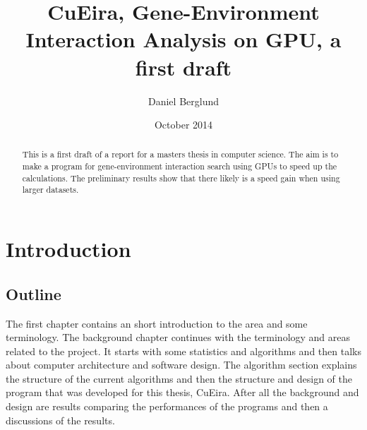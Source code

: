 \documentclass[10pt,a4paper]{report}
\title{CuEira, Gene-Environment Interaction Analysis on GPU, a first draft}
\author{Daniel Berglund}
\date{October 2014}
\makeatletter
\newcommand\ackname{Acknowledgements}
\newenvironment{acknowledgements}{
      \titlepage
      \null\vfil
      \@beginparpenalty\@lowpenalty
      \begin{center}%
        \bfseries \ackname
        \@endparpenalty\@M
      \end{center}}%
     {\par\vfil\null\endtitlepage}
\newenvironment{acknowledgements}{
      \if@twocolumn
        \section*{\abstractname}
      \else
        \small
        \begin{center}
          {\bfseries \ackname\vspace{-.5em}\vspace{\z@}}
        \end{center}
        \quotation
      \fi}
      {\if@twocolumn\else\endquotation\fi}
\makeatother
\begin{document}
\maketitle
\thispagestyle{empty}

\clearpage
\thispagestyle{empty}
\begin{abstract}
This is a first draft of a report for a masters thesis in computer science. The aim is to make a program for gene-environment interaction search using GPUs to speed up the calculations. The preliminary results show that there likely is a speed gain when using larger datasets.
\end{abstract}



\clearpage
\tableofcontents
\thispagestyle{empty}

\clearpage
\setcounter{page}{1}
\chapter{Introduction}

\section{Outline}
The first chapter contains an short introduction to the area and some terminology. The background chapter continues with the terminology and areas related to the project. It starts with some statistics and algorithms and then talks about computer architecture and software design. The algorithm section explains the structure of the current algorithms and then the structure and design of the program that was developed for this thesis, CuEira. After all the background and design are results comparing the performances of the programs and then a discussions of the results.

\end{document}
